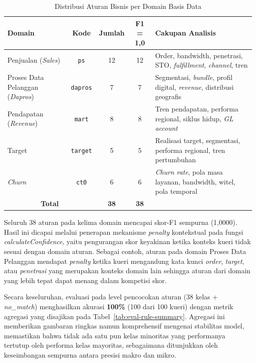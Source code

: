 \begin{table}[htbp]
\centering
\caption{Distribusi Aturan Bisnis per Domain Basis Data}
\label{tab:eval-rule-domain}
\begin{tabular}{|p{3.5cm}|c|c|c|p{4.5cm}|}
\hline
\textbf{Domain} & \textbf{Kode} & \textbf{Jumlah} & \textbf{F1 = 1{,}0} & \textbf{Cakupan Analisis} \\
\hline
Penjualan (\textit{Sales}) & \texttt{ps} & 12 & 12 & Order, bandwidth, penetrasi, STO, \textit{fulfillment}, \textit{channel}, tren \\
\hline
Proses Data Pelanggan (\textit{Dapros}) & \texttt{dapros} & 7 & 7 & Segmentasi, \textit{bundle}, profil digital, \textit{revenue}, distribusi geografis \\
\hline
Pendapatan (\textit{Revenue}) & \texttt{mart} & 8 & 8 & Tren pendapatan, performa regional, siklus hidup, \textit{GL account} \\
\hline
Target & \texttt{target} & 5 & 5 & Realisasi target, segmentasi, performa regional, tren pertumbuhan \\
\hline
\textit{Churn} & \texttt{ct0} & 6 & 6 & \textit{Churn rate}, pola masa layanan, bandwidth, witel, pola temporal \\
\hline
\multicolumn{2}{|c|}{\textbf{Total}} & \textbf{38} & \textbf{38} & \\
\hline
\end{tabular}
\end{table}

Seluruh 38 aturan pada kelima domain mencapai skor-F1 sempurna (1{,}0000). Hasil ini dicapai melalui penerapan mekanisme \textit{penalty} kontekstual pada fungsi \textit{calculateConfidence}, yaitu pengurangan skor keyakinan ketika konteks kueri tidak sesuai dengan domain aturan. Sebagai contoh, aturan pada domain Proses Data Pelanggan mendapat \textit{penalty} ketika kueri mengandung kata kunci \textit{order}, \allowbreak\textit{target}, \allowbreak atau \textit{penetrasi} yang merupakan konteks domain lain sehingga aturan dari domain yang lebih tepat dapat menang dalam kompetisi skor.

Secara keseluruhan, evaluasi pada level pencocokan aturan (38 kelas + \textit{no\_match}) menghasilkan akurasi \textbf{100\%} (100 dari 100 kueri) dengan metrik agregasi yang disajikan pada Tabel~\ref{tab:eval-rule-summary}. Agregasi ini memberikan gambaran ringkas namun komprehensif mengenai stabilitas model, memastikan bahwa tidak ada satu pun kelas minoritas yang performanya tertutup oleh performa kelas mayoritas, sebagaimana ditunjukkan oleh keseimbangan sempurna antara presisi makro dan mikro.

